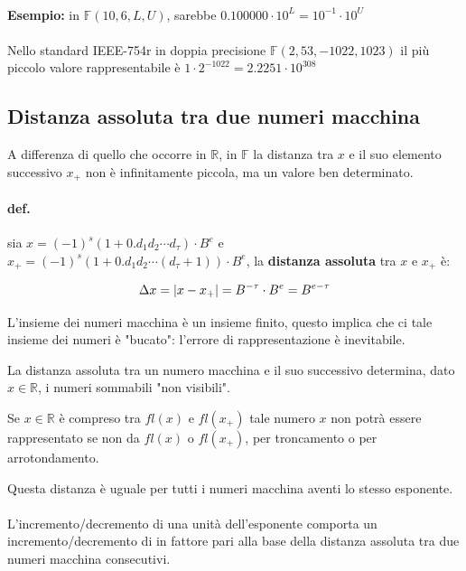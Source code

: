 \documentclass[a4paper, 11pt]{article}
\begin{document}
        \paragraph{}
        \textbf{Esempio: } in $\mathbb{F}(10,6,L,U)$, sarebbe $0.100000 \cdot 10^L = 10^{-1}\cdot 10^U$

        \paragraph{} Nello standard IEEE-754r in doppia precisione $\mathbb{F}(2, 53, -1022, 1023)$ il più piccolo valore rappresentabile è $ 1\cdot 2^{-1022} = 2.2251\cdot 10^{308}$



        \subsection{Distanza assoluta tra due numeri macchina}

        A differenza di quello che occorre in $\mathbb{R}$, in $\mathbb{F}$ la distanza tra $x$ e il suo elemento successivo $x_+$ non è infinitamente piccola, ma un valore ben determinato.
        \paragraph{def. } sia $x = (-1)^s(1+0.d_1d_2\cdots d_{\tau}) \cdot B^e$ e $x_+ = (-1)^s(1+0.d_1d_2\cdots (d_{\tau} + 1)) \cdot B^e$, la \textbf{distanza assoluta} tra $x$ e $x_+$ è:
        
        \begin{align}
            \Delta x = |x-x_+| = B^{-\tau} \cdot B^e = B^{e-\tau} \notag 
        \end{align}

        L'insieme dei numeri macchina è un insieme finito, questo implica che ci tale insieme dei numeri è "bucato": l'errore di rappresentazione è inevitabile. 

        La distanza assoluta tra un numero macchina e il suo successivo determina, dato $x \in \mathbb{R}$, i numeri sommabili "non visibili". 
        
        Se $x \in \mathbb{R}$ è compreso tra $fl(x)$ e $fl(x_+)$ tale numero $x$ non potrà essere rappresentato se non da $fl(x)$ o $fl(x_+)$, per troncamento o per arrotondamento. 

        Questa distanza è uguale per tutti i numeri macchina aventi lo stesso esponente.

        \paragraph{}
        L’incremento/decremento di una unità dell’esponente comporta un incremento/decremento di in fattore pari alla base della distanza assoluta tra due numeri macchina consecutivi.
\end{document}
